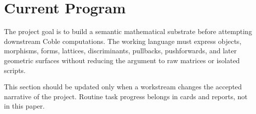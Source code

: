 \section{Current Program}

The project goal is to build a semantic mathematical substrate before attempting
downstream Coble computations. The working language must express objects,
morphisms, forms, lattices, discriminants, pullbacks, pushforwards, and later
geometric surfaces without reducing the argument to raw matrices or isolated scripts.

This section should be updated only when a workstream changes the accepted narrative of
the project. Routine task progress belongs in cards and reports, not in this paper.
